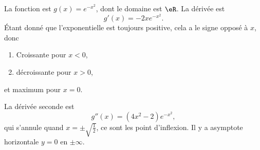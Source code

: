 \begin{corrige}{5}

La fonction est $g(x)= e^{-x^2}$, dont le domaine est $\eR$. La dérivée est
\begin{equation}
	g'(x)=-2x e^{-x^2}.
\end{equation}
Étant donné que l'exponentielle est toujours positive, cela a le signe opposé à $x$, donc
\begin{enumerate}

\item
Croissante pour $x<0$,
\item décroissante pour $x>0$,
\end{enumerate}
et maximum pour $x=0$.

La dérivée seconde est
\begin{equation}
	g''(x)=(4x^2-2) e^{-x^2},
\end{equation}
qui s'annule quand $x=\pm\sqrt{\frac{ 1 }{ 2 }}$, ce sont les point d'inflexion. Il y a asymptote horizontale  $y=0$ en $\pm\infty$.

%


\end{corrige}
